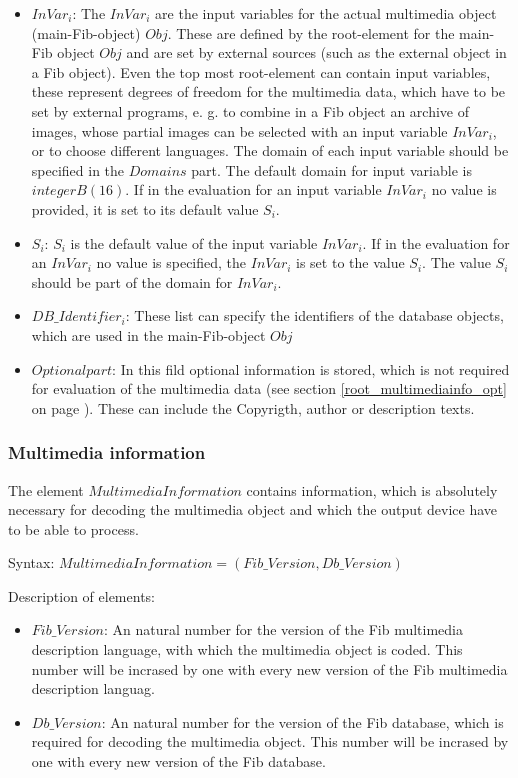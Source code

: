\begin{itemize}
 \item $InVar_i$: The $InVar_i$ are the input variables for the actual multimedia object (main-Fib-object) $Obj$. These are defined by the root-element for the main-Fib object $Obj$ and are set by external sources (such as the external object in a Fib object). Even the top most root-element can contain input variables, these represent degrees of freedom for the multimedia data, which have to be set by external programs, e. g. to combine in a Fib object an archive of images, whose partial images can be selected with an input variable $InVar_i$, or to choose different languages. The domain of each input variable should be specified in the $Domains$ part. The default domain for input variable is $integerB(16)$. If in the evaluation for an input variable $InVar_i$ no value is provided, it is set to its default value $S_i$.
 \item $S_i$: $S_i$ is the default value of the input variable $InVar_i$. If in the evaluation for an $InVar_i$ no value is specified, the $InVar_i$ is set to the value $S_i$. The value $S_i$ should be part of the domain for $InVar_i$.
 \item $DB\_Identifier_i$: These list can specify the identifiers of the database objects, which are used in the main-Fib-object $Obj$
 \item $Optionalpart$: In this fild optional information is stored, which is not required for evaluation of the multimedia data (see section \ref{root_multimediainfo_opt} on page \pageref{root_multimediainfo_opt}). These can include the Copyrigth, author or description texts.
\end{itemize}


\subsubsection{Multimedia information}
\label{root_multimediainfo}

The element $MultimediaInformation$ contains information, which is absolutely necessary for decoding the multimedia object and which the output device have to be able to process.

\bigskip\noindent
Syntax:
$MultimediaInformation = ( Fib\_Version, Db\_Version )$

\bigskip\noindent
Description of elements:
\begin{itemize}
 \item $Fib\_Version$: An natural number for the version of the Fib multimedia description language, with which the multimedia object is coded. This number will be incrased by one with every new version of the Fib multimedia description languag.
 \item $Db\_Version$: An natural number for the version of the Fib database, which is required for decoding the multimedia object. This number will be incrased by one with every new version of the Fib database.
\end{itemize}

